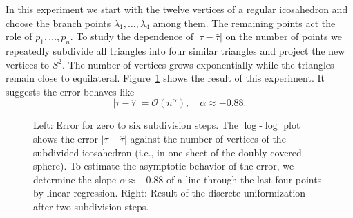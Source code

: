 \documentclass[Thesis]{subfiles}
\begin{document}



In this experiment we start with the twelve vertices of a regular
icosahedron and choose the branch points $\lambda_1,\ldots,\lambda_4$
among them. The remaining points act the role of $p_1,\ldots,p_n$. To study
the dependence of $|\tau-\hat \tau|$ on the number of points we
repeatedly subdivide all triangles into four similar triangles
and project the new vertices to $S^2$. The number of vertices
grows exponentially while the triangles remain close to equilateral.
Figure~\ref{fig:convergence_subdivision} shows the result of this
experiment. It suggests the error behaves like
\begin{equation}
\label{eq:error_ico}
|\tau-\hat \tau|=\mathcal O (n^\alpha),\quad\alpha \approx -0.88.
\end{equation}


\begin{figure}
\centering
{}
\caption{Left: Error for zero to six subdivision steps. The
  $\log$-$\log$ plot shows the error $|\tau - \hat\tau|$ against the
  number of vertices of the subdivided icosahedron (i.e., in one sheet
  of the doubly covered sphere). To estimate the asymptotic behavior
  of the error, we determine the slope $\alpha\approx-0.88$ of a line
  through the last four points by linear regression. Right: Result of
  the discrete uniformization after two subdivision steps.}
\label{fig:convergence_subdivision}
\end{figure}
\end{document}
